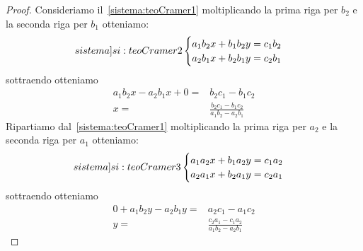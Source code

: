 \begin{proof}
	Consideriamo il~\cref{sistema:teoCramer1} moltiplicando la prima riga per $b_2$ e la seconda riga per $b_1$ otteniamo:
\begin{equation}\label[sistema]{si:teoCramer2}
\begin{cases}
a_1b_2x+b_1b_2y=c_1b_2\\
a_2b_1x+b_2b_1y=c_2b_1
\end{cases}
\end{equation}
sottraendo otteniamo
\begin{align*}
a_1b_2x-a_2b_1x+0=&b_2c_1-b_1c_2\\
x=&\frac{b_2c_1-b_1c_2}{a_1b_2-a_2b_1}
\end{align*}
Ripartiamo dal~\cref{sistema:teoCramer1} moltiplicando la prima riga per $a_2$ e la seconda riga per $a_1$ otteniamo:
\begin{equation}\label[sistema]{si:teoCramer3}
\begin{cases}
a_1a_2x+b_1a_2y=c_1a_2\\
a_2a_1x+b_2a_1y=c_2a_1
\end{cases}
\end{equation}
sottraendo otteniamo
\begin{align*}
0+a_1b_2y-a_2b_1y=&a_2c_1-a_1c_2\\
y=&\frac{c_2a_1-c_1a_2}{a_1b_2-a_2b_1}
\end{align*}
\end{proof}
